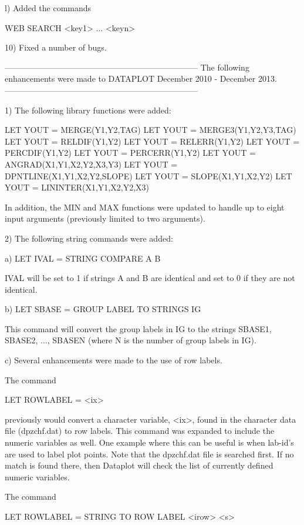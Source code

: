 {    l) Added the commands

         WEB SEARCH <key1> ... <keyn>

10) Fixed a number of bugs.

-----------------------------------------------------------------------
The following enhancements were made to DATAPLOT
December 2010 - December 2013.
-----------------------------------------------------------------------

 1) The following library functions were added:

        LET YOUT = MERGE(Y1,Y2,TAG)
        LET YOUT = MERGE3(Y1,Y2,Y3,TAG)
        LET YOUT = RELDIF(Y1,Y2)
        LET YOUT = RELERR(Y1,Y2)
        LET YOUT = PERCDIF(Y1,Y2)
        LET YOUT = PERCERR(Y1,Y2)
        LET YOUT = ANGRAD(X1,Y1,X2,Y2,X3,Y3)
        LET YOUT = DPNTLINE(X1,Y1,X2,Y2,SLOPE)
        LET YOUT = SLOPE(X1,Y1,X2,Y2)
        LET YOUT = LININTER(X1,Y1,X2,Y2,X3)

    In addition, the MIN and MAX functions were updated to handle up to
    eight input arguments (previously limited to two arguments).

 2) The following string commands were added:

    a) LET IVAL = STRING COMPARE A B

       IVAL will be set to 1 if strings A and B are identical and
       set to 0 if they are not identical.

    b) LET SBASE = GROUP LABEL TO STRINGS IG

       This command will convert the group labels in IG to
       the strings SBASE1, SBASE2, ..., SBASEN (where N is the
       number of group labels in IG).

    c) Several enhancements were made to the use of row labels.

       The command 

           LET ROWLABEL = <ix>

       previously would convert a character variable, <ix>,
       found in the character data file (dpzchf.dat) to row
       labels.  This command was expanded to include the
       numeric variables as well.  One example where this can
       be useful is when lab-id's are used to label plot points.
       Note that the dpzchf.dat file is searched first.  If no
       match is found there, then Dataplot will check the list
       of currently defined numeric variables.

       The command

          LET ROWLABEL = STRING TO ROW LABEL <irow> <s>

}
